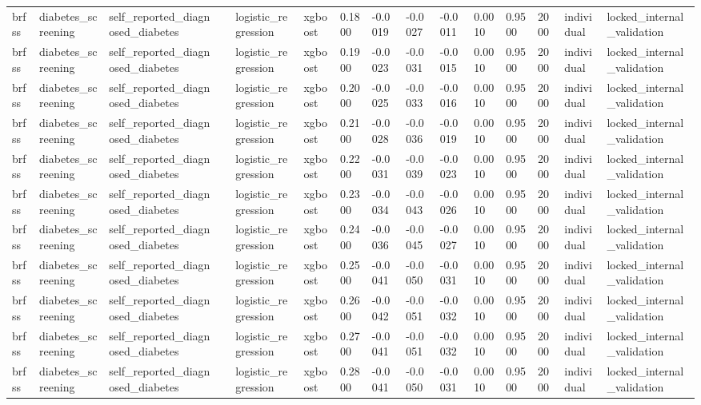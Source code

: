 \begin{tabular}{lllllllllllllll}
brfss & diabetes\_screening & self\_reported\_diagnosed\_diabetes &  & logistic\_regression & xgboost & 0.1800 & -0.0019 & -0.0027 & -0.0011 & 0.0010 & 0.9500 & 2000 & individual & locked\_internal\_validation \\
brfss & diabetes\_screening & self\_reported\_diagnosed\_diabetes &  & logistic\_regression & xgboost & 0.1900 & -0.0023 & -0.0031 & -0.0015 & 0.0010 & 0.9500 & 2000 & individual & locked\_internal\_validation \\
brfss & diabetes\_screening & self\_reported\_diagnosed\_diabetes &  & logistic\_regression & xgboost & 0.2000 & -0.0025 & -0.0033 & -0.0016 & 0.0010 & 0.9500 & 2000 & individual & locked\_internal\_validation \\
brfss & diabetes\_screening & self\_reported\_diagnosed\_diabetes &  & logistic\_regression & xgboost & 0.2100 & -0.0028 & -0.0036 & -0.0019 & 0.0010 & 0.9500 & 2000 & individual & locked\_internal\_validation \\
brfss & diabetes\_screening & self\_reported\_diagnosed\_diabetes &  & logistic\_regression & xgboost & 0.2200 & -0.0031 & -0.0039 & -0.0023 & 0.0010 & 0.9500 & 2000 & individual & locked\_internal\_validation \\
brfss & diabetes\_screening & self\_reported\_diagnosed\_diabetes &  & logistic\_regression & xgboost & 0.2300 & -0.0034 & -0.0043 & -0.0026 & 0.0010 & 0.9500 & 2000 & individual & locked\_internal\_validation \\
brfss & diabetes\_screening & self\_reported\_diagnosed\_diabetes &  & logistic\_regression & xgboost & 0.2400 & -0.0036 & -0.0045 & -0.0027 & 0.0010 & 0.9500 & 2000 & individual & locked\_internal\_validation \\
brfss & diabetes\_screening & self\_reported\_diagnosed\_diabetes &  & logistic\_regression & xgboost & 0.2500 & -0.0041 & -0.0050 & -0.0031 & 0.0010 & 0.9500 & 2000 & individual & locked\_internal\_validation \\
brfss & diabetes\_screening & self\_reported\_diagnosed\_diabetes &  & logistic\_regression & xgboost & 0.2600 & -0.0042 & -0.0051 & -0.0032 & 0.0010 & 0.9500 & 2000 & individual & locked\_internal\_validation \\
brfss & diabetes\_screening & self\_reported\_diagnosed\_diabetes &  & logistic\_regression & xgboost & 0.2700 & -0.0041 & -0.0051 & -0.0032 & 0.0010 & 0.9500 & 2000 & individual & locked\_internal\_validation \\
brfss & diabetes\_screening & self\_reported\_diagnosed\_diabetes &  & logistic\_regression & xgboost & 0.2800 & -0.0041 & -0.0050 & -0.0031 & 0.0010 & 0.9500 & 2000 & individual & locked\_internal\_validation \\

\end{tabular}

